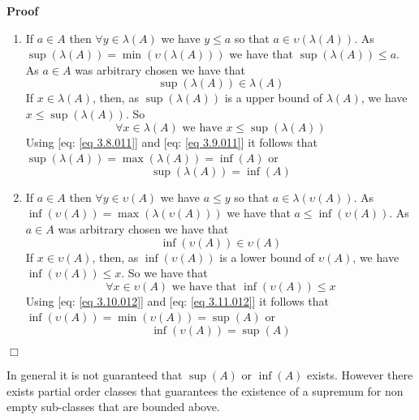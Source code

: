 \documentclass{book}
\newenvironment{proof}{\noindent\textbf{Proof\ }}{\hspace*{\fill}$\Box$\medskip}
\begin{document}
\begin{proof}
  
  \begin{enumerate}
    \item If $a \in A$ then $\forall y \in \lambda (A)$ we have $y \leqslant
    a$ so that $a \in \upsilon (\lambda (A))$. As $\sup (\lambda (A)) = \min
    (\upsilon (\lambda (A)))$ we have that $\sup (\lambda (A)) \leqslant a$.
    As $a \in A$ was arbitrary chosen we have that
    \begin{equation}
      \label{eq 3.8.011} \sup (\lambda (A)) \in \lambda (A)
    \end{equation}
    If $x \in \lambda (A)$, then, as $\sup (\lambda (A))$ is a upper bound of
    $\lambda (A)$, we have $x \leqslant \sup (\lambda (A))$. So
    \begin{equation}
      \label{eq 3.9.011} \forall x \in \lambda (A) \text{ we have $x \leqslant
      \sup (\lambda (A))$}
    \end{equation}
    Using [eq: \ref{eq 3.8.011}] and [eq: \ref{eq 3.9.011}] it follows that
    $\sup (\lambda (A)) = \max (\lambda (A)) = \inf (A)$ or
    \[ \sup (\lambda (A)) = \inf (A) \]
    \item If $a \in A$ then $\forall y \in \upsilon (A)$ we have $a \leqslant
    y$ so that $a \in \lambda (\upsilon (A))$. As $\inf (\upsilon (A)) = \max
    (\lambda (\upsilon (A)))$ we have that $a \leqslant \inf (\upsilon (A))$.
    As $a \in A$ was arbitrary chosen we have that
    \begin{equation}
      \label{eq 3.10.012} \inf (\upsilon (A)) \in \upsilon (A)
    \end{equation}
    If $x \in \upsilon (A)$, then, as $\inf (\upsilon (A))$ is a lower bound
    of $\upsilon (A)$, we have $\inf (\upsilon (A)) \leqslant x$. So we have
    that
    \begin{equation}
      \label{eq 3.11.012} \forall x \in \upsilon (A) \text{ we have that $\inf
      (\upsilon (A)) \leqslant x$}
    \end{equation}
    Using [eq: \ref{eq 3.10.012}] and [eq: \ref{eq 3.11.012}] it follows that
    $\inf (\upsilon (A)) = \min (\upsilon (A)) = \sup (A)$ or
    \[ \inf (\upsilon (A)) = \sup (A) \]
  \end{enumerate}
\end{proof}

In general it is not guaranteed that $\sup (A)$ or $\inf (A)$ exists. However
there exists partial order classes that guarantees the existence of a supremum
for non empty sub-classes that are bounded above.
\end{document}
